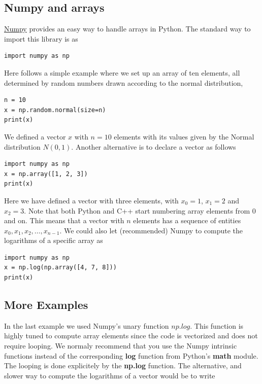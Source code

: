 \documentclass[%
oneside,                 %
final,                   %
10pt]{article}
\begin{document}
\noindent



\subsection*{Numpy and arrays}
\href{{http://www.numpy.org/}}{Numpy} provides an easy way to handle arrays in Python. The standard way to import this library is as

\begin{verbatim}
import numpy as np
\end{verbatim}
Here follows a simple example where we set up an array of ten elements, all determined by random numbers drawn according to the normal distribution,
\begin{verbatim}
n = 10
x = np.random.normal(size=n)
print(x)
\end{verbatim}
We defined a vector $x$ with $n=10$ elements with its values given by the Normal distribution $N(0,1)$.
Another alternative is to declare a vector as follows
\begin{verbatim}
import numpy as np
x = np.array([1, 2, 3])
print(x)
\end{verbatim}
Here we have defined a vector with three elements, with $x_0=1$, $x_1=2$ and $x_2=3$. Note that both Python and C++
start numbering array elements from $0$ and on. This means that a vector with $n$ elements has a sequence of entities $x_0, x_1, x_2, \dots, x_{n-1}$. We could also let (recommended) Numpy to compute the logarithms of a specific array as
\begin{verbatim}
import numpy as np
x = np.log(np.array([4, 7, 8]))
print(x)
\end{verbatim}

\subsection*{More Examples}

In the last example we used Numpy's unary function $np.log$. This function is
highly tuned to compute array elements since the code is vectorized
and does not require looping. We normaly recommend that you use the
Numpy intrinsic functions instead of the corresponding \textbf{log} function
from Python's \textbf{math} module. The looping is done explicitely by the
\textbf{np.log} function. The alternative, and slower way to compute the
logarithms of a vector would be to write
\end{document}
